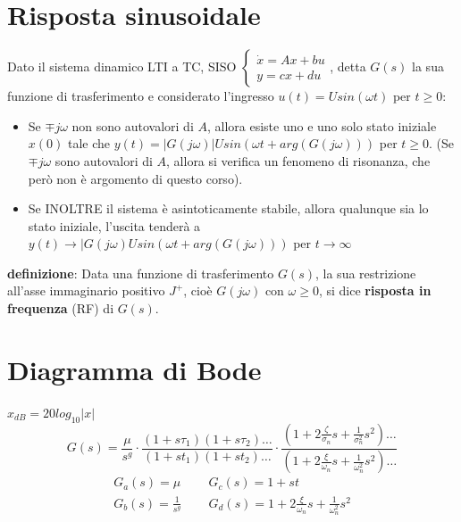 \begin{landscape}
\begin{multicols*}{3}
    \section{Risposta sinusoidale}
    Dato il sistema dinamico LTI a TC, SISO $\begin{cases}
        \dot{x} = Ax +bu\\ 
        y = cx +du
    \end{cases}$, detta $G(s)$ la sua funzione di trasferimento e considerato l'ingresso $u(t) = U sin(\omega t)$ per $t\geq 0$:
    \begin{itemize}
        \item Se $\mp j \omega$ non sono autovalori di $A$, allora esiste uno e uno solo stato iniziale $x(0)$ tale che $y(t) = |G(j \omega)| U sin(\omega t + arg(G(j \omega)))$ per $t\geq 0$. (Se $\mp j \omega$ sono autovalori di $A$, allora si verifica un fenomeno di risonanza, che però non è argomento di questo corso).
        \item Se INOLTRE il sistema è asintoticamente stabile, allora qualunque sia lo stato iniziale, l'uscita  tenderà a $y(t) \rightarrow |G(j \omega) U sin( \omega t + arg(G(j \omega)))$ per $t \rightarrow  \infty$
    \end{itemize}
    \textbf{definizione}:  Data una funzione di trasferimento $G(s)$, la sua restrizione all'asse immaginario positivo $J^+$, cioè $G(j \omega)$ con $\omega \geq 0$, si dice \textbf{risposta in frequenza} (RF) di $G(s)$.
    \newpage\section{Diagramma di Bode}
    $x_{dB} = 20 log_{10}|x|$\newline
    \[
        G(s) = \frac{\mu}{s^g} \cdot \frac{(1 + s \tau_1)(1 + s \tau_2)\dots}{(1 + s t_1)(1 + s t_2)\dots} \cdot \frac{(1 + 2 \frac{\zeta}{\sigma_n}s + \frac{1}{\sigma_n^2}s^2)\dots}{(1 + 2 \frac{\xi}{\omega_n} s + \frac{1}{\omega_n^2}s^2)\dots}
    \]
    \[
        \begin{matrix}
            G_a(s) = \mu & \;\; & G_c(s) = 1+ s t\\
            G_b(s) = \frac{1}{s^g} & \;\; & G_d(s) = 1 + 2 \frac{\xi}{\omega_n}s + \frac{1}{\omega_n^2}s^2
        \end{matrix}
    \]

\end{multicols*}
\end{landscape}
